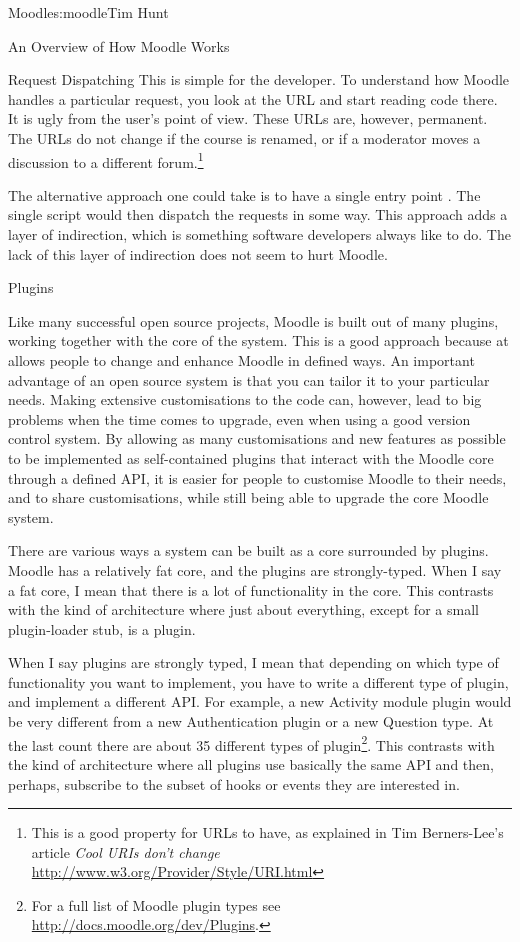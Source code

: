 \begin{aosachapter}{Moodle}{s:moodle}{Tim Hunt}
\begin{aosasect1}{An Overview of How Moodle Works}
\begin{aosasect2}{Request Dispatching}
This is simple for the developer. To understand
how Moodle handles a particular request, you look at the URL and start
reading code there. It is ugly from the user's point of view. These
URLs are, however, permanent. The URLs do not change if the course is
renamed, or if a moderator moves a discussion to a different forum.\footnote{This
is a good property for URLs to have, as explained in Tim Berners-Lee's article
\emph{Cool URIs don't change} \url{http://www.w3.org/Provider/Style/URI.html}}

The alternative approach one could take is to have a single entry
point 
. The single script  would then dispatch
the requests in some way. This approach adds a layer of indirection,
which is something software developers always like to do. The lack of
this layer of indirection does not seem to hurt Moodle.

\end{aosasect2}

\begin{aosasect2}{Plugins}

Like many successful open source projects, Moodle is built out of many
plugins, working together with the core of the system. This is a good
approach because at allows people to change and enhance Moodle in
defined ways. An important advantage of an open source system is that
you can tailor it to your particular needs. Making extensive
customisations to the code can, however, lead to big problems when the
time comes to upgrade, even when using a good version control
system. By allowing as many customisations and new features as
possible to be implemented as self-contained plugins that interact
with the Moodle core through a defined API, it is easier for people to
customise Moodle to their needs, and to share customisations, while
still being able to upgrade the core Moodle system.

There are various ways a system can be built as a core surrounded by
plugins. Moodle has a relatively fat core, and the plugins are
strongly-typed. When I say a fat core, I mean that there is a lot of
functionality in the core. This contrasts with the kind of architecture
where just about everything, except for a small plugin-loader stub, is
a plugin.

When I say plugins are strongly typed, I mean that depending on which
type of functionality you want to implement, you have to write a
different type of plugin, and implement a different API. For example,
a new Activity module plugin would be very different from a new
Authentication plugin or a new Question type. At the last count there
are about 35 different types of plugin\footnote{For a full list of Moodle plugin types
see \url{http://docs.moodle.org/dev/Plugins}.}. This contrasts with the kind
of architecture where all plugins use basically the same API and then,
perhaps, subscribe to the subset of hooks or events they are
interested in.


\end{aosasect2}
\end{aosasect1}
\end{aosachapter}

